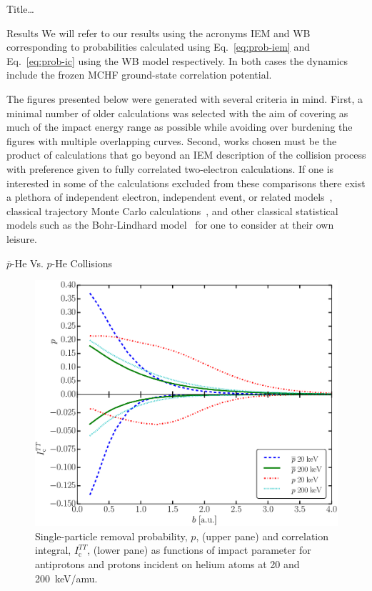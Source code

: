 \documentclass[letterpaper, 11 pt]{report}
\begin{document}
\begin{chapter}{ Title\dots \label{chap:p-he2p-he}}
\begin{section}{Results \label{sec:phe2p-res}}
      We will refer to our results using the acronyms IEM and WB corresponding to probabilities
      calculated using Eq.~\eqref{eq:prob-iem} and Eq.~\eqref{eq:prob-ic} using the WB model
      respectively. In both cases the dynamics include the frozen MCHF ground-state correlation
      potential.

      The figures presented below were generated with several criteria in mind. First, a minimal number
      of older calculations was selected with the aim of covering as much of the impact energy range as
      possible while avoiding over burdening the figures with multiple overlapping curves. Second, works
      chosen must be the product of calculations that go beyond an IEM description of the collision
      process with preference given to fully correlated two-electron calculations. If one is interested
      in some of the calculations excluded from these comparisons there exist a plethora of independent
      electron, independent event, or related models~\cite{SLD-83, DMR-84, SLD-85, GM-86, CM-87, GM-87,
      JLF-89, DC-90, DC-91a, DC-91b, DG-91, SKG-91, SL-91, Kuang-92, MLC-93, CM-94, CSR-95, BDM-96,
      MBGH-97, McCartney-97, Mccartney-99, GAMRF-02, GFS-02, AMRF-04, BLMC-04, FRBJG-06, FJG-07,
      GIFK-08, ZK-09, G-11, LFG-11, GG-12}, classical trajectory Monte Carlo calculations~\cite{ZM-85,
      OWM-86, MO-87, WO-88, MS-89, Cohen-96, TH-96, MMTH-02, DAKW-04, GEP-09}, and other classical
      statistical models such as the Bohr-Lindhard model~\cite{DYC-08,Ding-12} for one to consider at
      their own leisure.

      \begin{subsection}{ \texorpdfstring{$\bar{p}$}{pbar}-He Vs. \texorpdfstring{$p$}{p}-He Collisions
                         \label{sec:pbarhe-res}}

         \begin{figure}[htp]
            \centering
            \includegraphics[width = 0.49\linewidth]{./images/p-ic.eps}
            \caption[Single-particle removal and correlation integral]
                    {Single-particle removal probability, $p$, (upper pane) and
                     correlation integral, $I_\mathrm{c}^{TT}$, (lower pane) as functions of impact
                     parameter for antiprotons and protons incident on helium atoms at 20 and
                     200~keV/amu. \label{fig:p-ic}}
         \end{figure}


\end{subsection}
\end{section}
\end{chapter}
\end{document}

